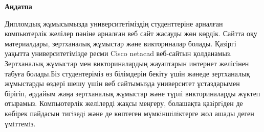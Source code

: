 \newpage
\pagestyle{plain}

{
\begin{center}
    \Large
    \textbf{Аңдатпа}
\end{center}

   Дипломдық жұмысымызда университетіміздің  студенттеріне арналған компьютерлік желілер пәніне арналған веб сайт жасауды жөн көрдік. Сайтта оқу материалдары, зертханалық жұмыстар және викториналар болады. Қазіргі уақытта университетімізде ресми Cisco netacad веб-сайтын қолданамыз. Зертханалық жұмыстар мен викториналардың жауаптарын интернет желісінен табуға болады.Біз студентеріміз өз білімдерін бекіту үшін жәнеде зертханалық жұмыстарды өздері шешу үшін веб сайтымызда университет ұстаздарымен бірігіп, әрдайым жаңа зертханалық жұмыстар және түрлі викториналарды жүктеп отырамыз. Компьютерлік желілерді жақсы меңгеру, болашақта қазiргiден де көбiрек пайдасын тигiзедi және де көптеген мүмкiншiлiктерге жол ашады деген үмiттемiз. 

}